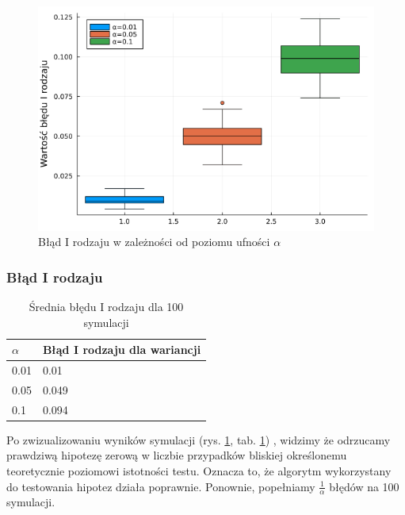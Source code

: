 \documentclass{article}
\theoremstyle{break}
\begin{document}
\begin{figure}
	\begin{center}
		\includegraphics[scale=0.5]{Z3.Irodzaj.png}
		\caption{Błąd I rodzaju w zależności od poziomu ufności $\alpha$}
		\label{fig:11}
	\end{center}
\end{figure}

\subsubsection*{Błąd I rodzaju}


\begin{table}[H]
	\begin{center}
		\begin{tabular}{|l|l|}
			\hline
			\rowcolor[HTML]{EFEFEF} 
			$\alpha$ & Błąd I rodzaju dla wariancji \\ \hline
			0.01 & 0.01                         \\ \hline
			0.05 & 0.049                         \\ \hline
			0.1  & 0.094                         \\ \hline
		\end{tabular}
		\caption{Średnia błędu I rodzaju dla 100 symulacji}
		\label{table:3}
	\end{center}
\end{table}
Po zwizualizowaniu wyników symulacji (rys. \ref{fig:11}, tab. \ref{table:3}) , widzimy że odrzucamy prawdziwą hipotezę zerową w liczbie przypadków bliskiej określonemu teoretycznie poziomowi istotności testu. Oznacza to, że algorytm wykorzystany do testowania hipotez działa poprawnie. Ponownie, popełniamy $\frac{1}{\alpha}$ błędów na 100 symulacji.
\end{document}

